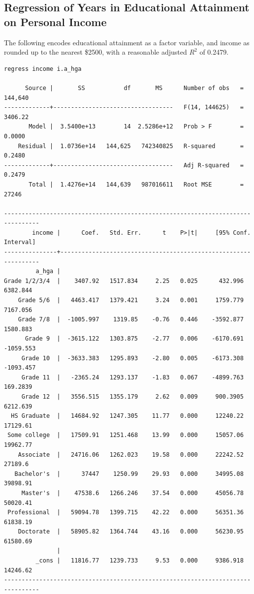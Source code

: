 \documentclass{article}
\begin{document}
\begin{landscape}
\end{landscape}

\subsection*{Regression of Years in Educational Attainment on Personal Income}

The following encodes educational attainment as a factor variable, and income as rounded up to the nearest \$2500, with a reasonable adjusted $R^2$ of 0.2479.
\begin{verbatim}
regress income i.a_hga

      Source |       SS           df       MS      Number of obs   =   144,640
-------------+----------------------------------   F(14, 144625)   =   3406.22
       Model |  3.5400e+13        14  2.5286e+12   Prob > F        =    0.0000
    Residual |  1.0736e+14   144,625   742340825   R-squared       =    0.2480
-------------+----------------------------------   Adj R-squared   =    0.2479
       Total |  1.4276e+14   144,639   987016611   Root MSE        =     27246

--------------------------------------------------------------------------------
        income |      Coef.   Std. Err.      t    P>|t|     [95% Conf. Interval]
---------------+----------------------------------------------------------------
         a_hga |
Grade 1/2/3/4  |    3407.92   1517.834     2.25   0.025      432.996    6382.844
    Grade 5/6  |   4463.417   1379.421     3.24   0.001     1759.779    7167.056
    Grade 7/8  |  -1005.997    1319.85    -0.76   0.446    -3592.877    1580.883
      Grade 9  |  -3615.122   1303.875    -2.77   0.006    -6170.691   -1059.553
     Grade 10  |  -3633.383   1295.893    -2.80   0.005    -6173.308   -1093.457
     Grade 11  |   -2365.24   1293.137    -1.83   0.067    -4899.763    169.2839
     Grade 12  |   3556.515   1355.179     2.62   0.009     900.3905    6212.639
  HS Graduate  |   14684.92   1247.305    11.77   0.000     12240.22    17129.61
 Some college  |   17509.91   1251.468    13.99   0.000     15057.06    19962.77
    Associate  |   24716.06   1262.023    19.58   0.000     22242.52     27189.6
   Bachelor's  |      37447    1250.99    29.93   0.000     34995.08    39898.91
     Master's  |    47538.6   1266.246    37.54   0.000     45056.78    50020.41
 Professional  |   59094.78   1399.715    42.22   0.000     56351.36    61838.19
    Doctorate  |   58905.82   1364.744    43.16   0.000     56230.95    61580.69
               |
         _cons |   11816.77   1239.733     9.53   0.000     9386.918    14246.62
--------------------------------------------------------------------------------	
\end{verbatim}
\end{document}
